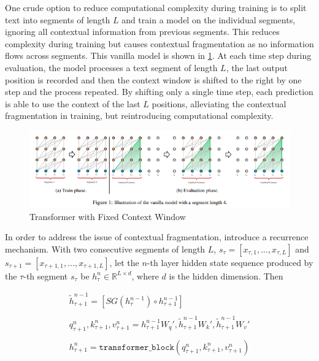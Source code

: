 \documentclass[11pt]{article}
\theoremstyle{definition}
\begin{document}
One crude option to reduce computational complexity during training is to split text into segments of length $L$ and train a model on the individual segments, ignoring all contextual information from previous segments. This reduces complexity during training but causes contextual fragmentation as no information flows across segments. This vanilla model is shown in \ref{fig:transformerxl-vanilla}. At each time step during evaluation, the model processes a text segment of length $L$, the last output position is recorded and then the context window is shifted to the right by one step and the process repeated. By shifting only a single time step, each prediction is able to use the context of the last $L$ positions, alleviating the contextual fragmentation in training, but reintroducing computational complexity. 

\begin{figure}
\centering
  \includegraphics[width=\textwidth,height=\textheight,keepaspectratio]{transformers/transformerXL_vanilla.png}
  \caption{Transformer with Fixed Context Window \cite{dai2019transformerxl}}
  \label{fig:transformerxl-vanilla}
\end{figure}

In order to address the issue of contextual fragmentation, \cite{dai2019transformerxl} introduce a recurrence mechanism. With two consecutive segments of length $L$, $s_{\tau} = \left[ x_{\tau,1},...,x_{\tau,L} \right]$ and $s_{\tau+1} = \left[x_{\tau+1,1},...,x_{\tau+1,L}\right]$, let the $n$-th layer hidden state sequence produced by the $\tau$-th segment $s_{\tau}$ be $h_{\tau}^n \in \mathbb{R}^{L \times d}$, where $d$ is the hidden dimension. Then

\begin{equation}
\begin{array}{l}
\tilde{h}_{\tau+1}^{n-1} = \left[ SG(h_{\tau}^{n-1}) \circ h_{\tau+1}^{n-1} \right] \\
\\

q_{\tau+1}^n,k_{\tau+1}^n,v_{\tau+1}^n = h_{\tau+1}^{n-1}W_q', \tilde{h}_{\tau+1}^{n-1}W_k', \tilde{h}_{\tau+1}^{n-1}W_v' \\
\\
h_{\tau+1}^n = \mathtt{transformer\_block}(q_{\tau+1}^n,k_{\tau+1}^n,v_{\tau+1}^n)
\end{array}
\end{equation}
\end{document}
